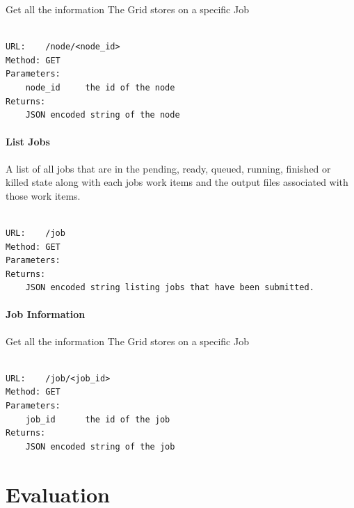 Get all the information The Grid stores on a specific Job

\begin{adjustwidth}{2.5em}{2.5em}
\begin{verbatim}

URL:    /node/<node_id>
Method: GET
Parameters:
    node_id     the id of the node
Returns:    
    JSON encoded string of the node

\end{verbatim}
\end{adjustwidth}

\subsection{List Jobs}
\label{listjobs}

A list of all jobs that are in the pending, ready, queued, running, finished or killed state along with each jobs work items and the output files associated with those work items.

\begin{adjustwidth}{2.5em}{2.5em}
\begin{verbatim}

URL:    /job
Method: GET
Parameters:
Returns:    
    JSON encoded string listing jobs that have been submitted.

\end{verbatim}
\end{adjustwidth}

\subsection{Job Information}
\label{jobinformation}

Get all the information The Grid stores on a specific Job

\begin{adjustwidth}{2.5em}{2.5em}
\begin{verbatim}

URL:    /job/<job_id>
Method: GET
Parameters:
    job_id      the id of the job
Returns:    
    JSON encoded string of the job

\end{verbatim}
\end{adjustwidth}

\part{Evaluation}
\label{evaluation}

